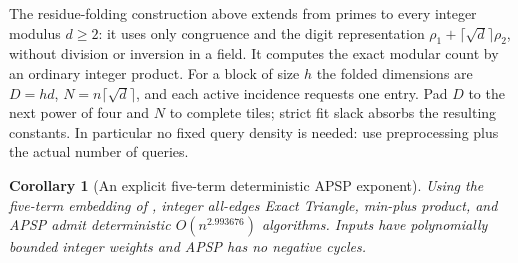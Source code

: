 \documentclass[11pt]{article}
\newtheorem{corollary}[theorem]{Corollary}
\begin{document}
The residue-folding construction above extends from primes to every integer
modulus $d\ge2$: it uses only congruence and the digit representation
$\rho_1+\lceil\sqrt d\rceil\rho_2$, without division or inversion in a field.
It computes the exact modular count by an ordinary integer product.
For a block of size $h$ the folded dimensions are
$D=hd$, $N=n\lceil\sqrt d\rceil$, and each active incidence requests one
entry. Pad $D$ to the next power of four and $N$ to complete tiles; strict
fit slack absorbs the resulting constants. In particular no fixed query
density is needed: use preprocessing plus the actual number of queries.

\begin{corollary}[An explicit five-term deterministic APSP exponent]
\label{cor:five-apsp}
Using the five-term embedding of \cite{M26}, integer all-edges Exact
Triangle, min-plus product, and APSP admit deterministic
$O(n^{2.993676})$ algorithms. Inputs have polynomially bounded integer
weights and APSP has no negative cycles.
\end{corollary}
\end{document}
